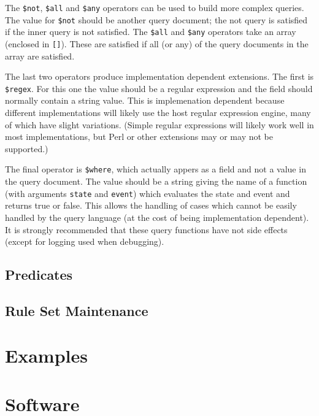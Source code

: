 \documentclass{article}
\begin{document}
  The \texttt{\$not}, \texttt{\$all} and \texttt{\$any} operators can
  be used to build more complex queries.  The value for \texttt{\$not}
  should be another query document; the not query is satisfied if the
  inner query is not satisfied.  The \texttt{\$all} and \texttt{\$any}
  operators take an array (enclosed in \texttt{[]}).  These are
  satisfied if all (or any) of the query documents in the array are
  satisfied.

  The last two operators produce implementation dependent extensions.
  The first is \texttt{\$regex}.  For this one the value should be a
  regular expression and the field should normally contain a string
  value.  This is implemenation dependent because different
  implementations will likely use the host regular expression engine,
  many of which have slight variations.  (Simple regular expressions
  will likely work well in most implementations, but Perl or other
  extensions may or may not be supported.) 

  The final operator is \texttt{\$where}, which actually appers as a
  field and not a value in the query document.  The value should be a
  string giving the name of a function (with arguments \texttt{state}
  and \texttt{event}) which evaluates the state and event and returns
  true or false.  This allows the handling of cases which cannot be
  easily handled by the query language (at the cost of being
  implementation dependent).  It is strongly recommended that these
  query functions have not side effects (except for logging used when
  debugging).  


  \subsection{Predicates}
  \label{sub:pred}

  \subsection{Rule Set Maintenance}
  \label{sub:ruleSet}

  \section{Examples}
  \label{sec:examples}
  
  \section{Software}
  \label{sec:software}

  
  
  
\end{document}
